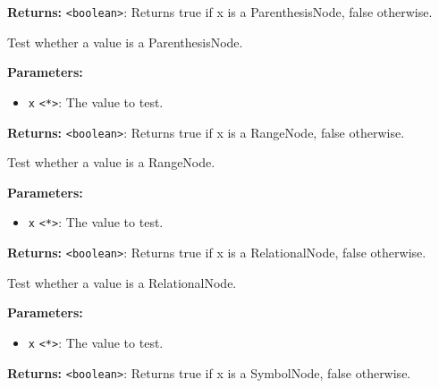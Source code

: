 \documentclass[12pt,a4paper]{article}
\begin{document}
\noindent \textbf{Returns:} \texttt{<boolean>}: Returns true if \textasciigrave{}x\textasciigrave{} is a ParenthesisNode, false otherwise.

\noindent Test whether a value is a ParenthesisNode.

\vspace{5mm}
\noindent {}


\noindent \textbf{Parameters:}
\begin{itemize}
  \item \texttt{x} \texttt{<*>}: The value to test.
\end{itemize}

\noindent \textbf{Returns:} \texttt{<boolean>}: Returns true if \textasciigrave{}x\textasciigrave{} is a RangeNode, false otherwise.

\noindent Test whether a value is a RangeNode.

\vspace{5mm}
\noindent {}


\noindent \textbf{Parameters:}
\begin{itemize}
  \item \texttt{x} \texttt{<*>}: The value to test.
\end{itemize}

\noindent \textbf{Returns:} \texttt{<boolean>}: Returns true if \textasciigrave{}x\textasciigrave{} is a RelationalNode, false otherwise.

\noindent Test whether a value is a RelationalNode.

\vspace{5mm}
\noindent {}


\noindent \textbf{Parameters:}
\begin{itemize}
  \item \texttt{x} \texttt{<*>}: The value to test.
\end{itemize}

\noindent \textbf{Returns:} \texttt{<boolean>}: Returns true if \textasciigrave{}x\textasciigrave{} is a SymbolNode, false otherwise.
\end{document}
